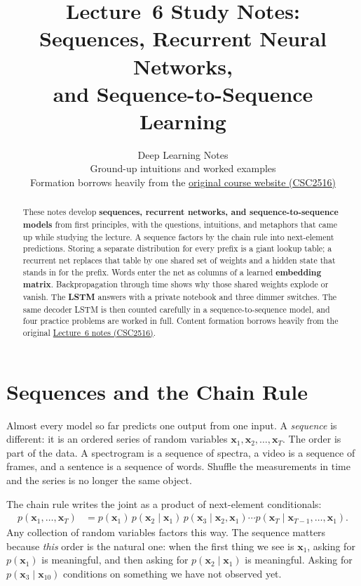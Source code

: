 \documentclass[11pt]{article}
\title{Lecture~6 Study Notes:\\Sequences, Recurrent Neural Networks,\\and Sequence-to-Sequence Learning}
\author{Deep Learning Notes\\
\small Ground-up intuitions and worked examples\\[0.35em]
\small Formation borrows heavily from the
\href{https://r-three.github.io/deep-learning-lecture-notes/}{original course website (CSC2516)}}
\date{}
\begin{document}
\maketitle

\begin{abstract}
These notes develop \textbf{sequences, recurrent networks, and
sequence-to-sequence models} from first principles, with the questions,
intuitions, and metaphors that came up while studying the lecture. A
sequence factors by the chain rule into next-element predictions. Storing a
separate distribution for every prefix is a giant lookup table; a recurrent
net replaces that table by one shared set of weights and a hidden state
that stands in for the prefix. Words enter the net as columns of a learned
\textbf{embedding matrix}. Backpropagation through time shows why those
shared weights explode or vanish. The \textbf{LSTM} answers with a private
notebook and three dimmer switches. The same decoder LSTM is then counted
carefully in a sequence-to-sequence model, and four practice problems are
worked in full. Content formation borrows heavily from the original
\href{https://r-three.github.io/deep-learning-lecture-notes/lectures/06-sequences-recurrent-neural-networks-and-sequence-to-sequence-learning.html}{Lecture~6 notes (CSC2516)}.
\end{abstract}

\tableofcontents
\vspace{1em}

\section{Sequences and the Chain Rule}

Almost every model so far predicts one output from one input. A
\emph{sequence} is different: it is an ordered series of random variables
\(\mathbf{x}_1,\mathbf{x}_2,\ldots,\mathbf{x}_T\). The order is part of the
data. A spectrogram is a sequence of spectra, a video is a sequence of
frames, and a sentence is a sequence of words. Shuffle the measurements in
time and the series is no longer the same object.

The chain rule writes the joint as a product of next-element conditionals:
\begin{equation}
\label{eq:chain}
\begin{aligned}
p(\mathbf{x}_1,\ldots,\mathbf{x}_T)
&=
p(\mathbf{x}_1)\,
p(\mathbf{x}_2\mid\mathbf{x}_1)\,
p(\mathbf{x}_3\mid\mathbf{x}_2,\mathbf{x}_1)
\cdots
p(\mathbf{x}_T\mid\mathbf{x}_{T-1},\ldots,\mathbf{x}_1).
\end{aligned}
\end{equation}
Any collection of random variables factors this way. The sequence matters
because \emph{this} order is the natural one: when the first thing we see
is \(\mathbf{x}_1\), asking for \(p(\mathbf{x}_1)\) is meaningful, and then
asking for \(p(\mathbf{x}_2\mid\mathbf{x}_1)\) is meaningful. Asking for
\(p(\mathbf{x}_3\mid\mathbf{x}_{10})\) conditions on something we have not
observed yet.
\end{document}
